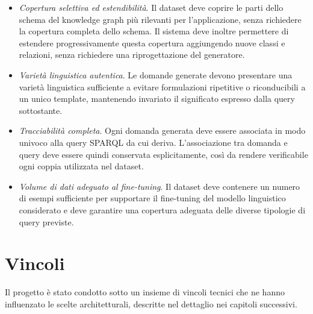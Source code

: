 \documentclass[12pt,a4paper,openright,twoside]{book}
\begin{document}
\begin{itemize}
    \item[\textbf{O1}]\label{obj:O1} \textit{Copertura selettiva ed
              estendibilità}. Il dataset deve coprire le parti dello schema del
          knowledge graph più rilevanti per l'applicazione, senza richiedere
          la copertura completa dello schema. Il sistema deve inoltre
          permettere di estendere progressivamente questa copertura
          aggiungendo nuove classi e relazioni, senza richiedere una
          riprogettazione del generatore.

    \item[\textbf{O2}]\label{obj:O2} \textit{Varietà linguistica autentica}. Le
          domande generate devono presentare una varietà linguistica sufficiente
          a evitare formulazioni ripetitive o riconducibili a un unico template,
          mantenendo invariato il significato espresso dalla query sottostante.

    \item[\textbf{O3}]\label{obj:O3} \textit{Tracciabilità completa}. Ogni
          domanda generata deve essere associata in modo univoco alla query
          SPARQL da cui deriva. L'associazione tra domanda e query deve essere
          quindi conservata esplicitamente, così da rendere verificabile ogni
          coppia utilizzata nel dataset.

    \item[\textbf{O4}]\label{obj:O4} \textit{Volume di dati adeguato al
              fine-tuning}. Il dataset deve contenere un numero di esempi
          sufficiente per supportare il fine-tuning del modello linguistico
          considerato e deve garantire una copertura adeguata delle diverse
          tipologie di query previste.

\end{itemize}

\section{Vincoli}

Il progetto è stato condotto sotto un insieme di vincoli tecnici che ne hanno
influenzato le scelte architetturali, descritte nel dettaglio nei capitoli
successivi.
\end{document}
